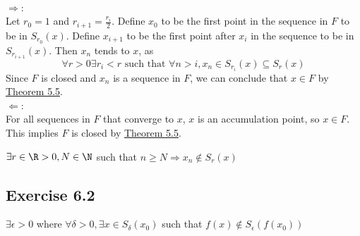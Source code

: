
\begin{solution}
 \\$\Rightarrow$: \\
 Let $r_0 = 1$ and $r_{i+1} = \frac{r_i}{2}$. Define $x_0$ to be the first point in the sequence in $F$ to be in $S_{r_0}(x)$. Define $x_{i+1}$ to be the first point after $x_i$ in the sequence to be in $S_{r_{i+1}}(x)$. Then $x_n$ tends to $x$, as 
 $$\forall r > 0 \exists r_i < r \text{ such that } \forall n > i, x_n \in S_{r_i}(x) \subseteq S_r(x)$$
 Since $F$ is closed and $x_n$ is a sequence in $F$, we can conclude that $x \in F$ by \hyperref[thm3.5.5]{Theorem 5.5}. \\
 
 $\Leftarrow$: \\
 For all sequences in $F$ that converge to $x$, $x$ is an accumulation point, so $x \in F$. This implies $F$ is closed by \hyperref[thm3.5.5]{Theorem 5.5}.
\end{solution}


\begin{solution}
 $\exists r \in \R > 0, N \in \N$ such that $n \geq N \Rightarrow x_n \notin S_r(x)$
\end{solution}

\subsection{Exercise 6.2}
\setcounter{question}{0}


\begin{solution}
 $\exists \epsilon > 0$ where $\forall \delta > 0, \exists x \in S_\delta(x_0)$ such that $f(x) \notin S_\epsilon(f(x_0))$
\end{solution}


